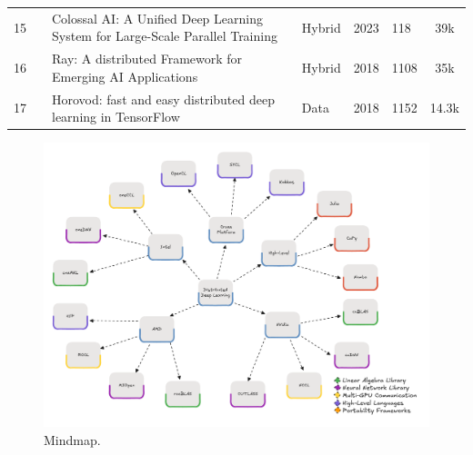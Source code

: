\begin{table}[htbp]
\begin{tabular}{llp{8.4cm}lllc}
		\small 15          & \small \cite{li_colossal-ai_2023}       & \small Colossal AI: A Unified Deep Learning System for Large-Scale Parallel Training                             & \small Hybrid        & \small 2023          & \small 118                & \small 39k \cite{noauthor_hpcaitechcolossalai_2025}                  \\[1ex]
		\small 16          & \small \cite{moritz_ray_2018}           & \small Ray: A distributed Framework for Emerging AI Applications                                                 & \small Hybrid        & \small 2018          & \small 1108               & \small 35k \cite{noauthor_ray-projectray_2025}                       \\[1ex]
		\small 17          & \small \cite{sergeev_horovod_2018}      & \small Horovod: fast and easy distributed deep learning in TensorFlow                                            & \small Data          & \small 2018          & \small 1152               & \small 14.3k \cite{noauthor_horovodhorovod_2025}                     \\[1ex]
		\hline
	\end{tabular}
\end{table}

\begin{figure}[th]
	\centering
	\includegraphics[width=\linewidth]{figures/mindmap-cuda}
	\caption{Mindmap.}
	\label{fig:mindmap-cuda}
\end{figure}

